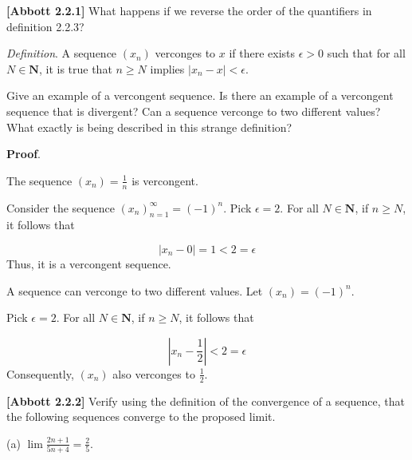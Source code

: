 \documentclass[10pt]{article}
\begin{document}
\textbf{[Abbott 2.2.1] }What happens if we reverse the order of the quantifiers in definition 2.2.3?



\textit{Definition}. A sequence $\displaystyle ( x_{n})$ verconges to $\displaystyle x$ if there exists $\displaystyle \epsilon  >0$ such that for all $\displaystyle N\in \mathbf{N}$, it is true that $\displaystyle n\geq N$ implies $\displaystyle |x_{n} -x|< \epsilon $.



Give an example of a vercongent sequence. Is there an example of a vercongent sequence that is divergent? Can a sequence verconge to two different values? What exactly is being described in this strange definition?



\textbf{Proof}.



The sequence $\displaystyle ( x_{n}) =\frac{1}{n}$ is vercongent. 



Consider the sequence $\displaystyle ( x_{n})_{n=1}^{\infty } =( -1)^{n}$. Pick $\displaystyle \epsilon =2$. For all $\displaystyle N\in \mathbf{N}$, if $\displaystyle n\geq N$, it follows that


\begin{equation*}
|x_{n} -0|=1< 2=\epsilon 
\end{equation*}
Thus, it is a vercongent sequence.



A sequence can verconge to two different values. Let $\displaystyle ( x_{n}) =( -1)^{n}$. 



Pick $\displaystyle \epsilon =2$. For all $\displaystyle N\in \mathbf{N}$, if $\displaystyle n\geq N$, it follows that 


\begin{equation*}
|x_{n} -\frac{1}{2} |< 2=\epsilon 
\end{equation*}
Consequently, $\displaystyle ( x_{n})$ also verconges to $\displaystyle \frac{1}{2}$. 



\textbf{[Abbott 2.2.2]} Verify using the definition of the convergence of a sequence, that the following sequences converge to the proposed limit.



(a) $\displaystyle \lim \frac{2n+1}{5n+4} =\frac{2}{5}$.
\end{document}
